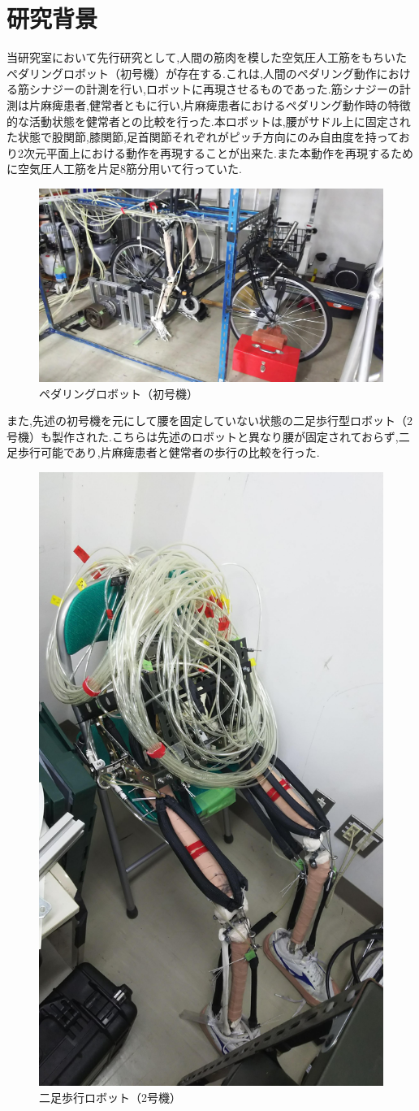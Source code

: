 \section{研究背景}
当研究室において先行研究として,人間の筋肉を模した空気圧人工筋をもちいたペダリングロボット（初号機）が存在する.これは,人間のペダリング動作における筋シナジーの計測を行い,ロボットに再現させるものであった.筋シナジーの計測は片麻痺患者,健常者ともに行い,片麻痺患者におけるペダリング動作時の特徴的な活動状態を健常者との比較を行った.本ロボットは,腰がサドル上に固定された状態で股関節,膝関節,足首関節それぞれがピッチ方向にのみ自由度を持っており2次元平面上における動作を再現することが出来た.また本動作を再現するために空気圧人工筋を片足8筋分用いて行っていた.
\begin{figure}[h]
 \begin{center}
  \includegraphics[width=0.5\columnwidth,clip]{Photo/BackGround/1st.eps}
  \caption{ペダリングロボット（初号機）}
  \label{初号機}
  \end{center}
  \end{figure}

また,先述の初号機を元にして腰を固定していない状態の二足歩行型ロボット（2号機）も製作された.こちらは先述のロボットと異なり腰が固定されておらず,二足歩行可能であり,片麻痺患者と健常者の歩行の比較を行った.
  \begin{figure}[h]
  \begin{center}
  \includegraphics[width=0.25\columnwidth,clip]{Photo/BackGround/2nd.eps}
  \caption{二足歩行ロボット（2号機）}
  \label{2号機}
 \end{center}
\end{figure}

